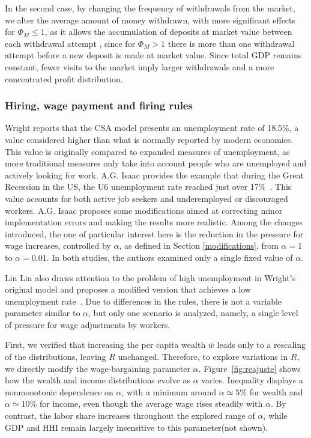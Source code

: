 In the second case, by changing the frequency of withdrawals from the market, we alter the average amount of money withdrawn, with more significant effects for $\Phi_{M}\le1$, as it allows the accumulation of deposits at market value between each withdrawal attempt , since for $\Phi_{M}>1$ there is more than one withdrawal attempt before a new deposit is made at market value. Since total GDP remains constant, fewer visits to the market imply larger withdrawals and a more concentrated profit distribution.

\subsubsection{Hiring, wage payment and firing rules}

\label{sec:hiring}

Wright reports that the CSA model presents an unemployment rate of 18.5\%, a value considered higher than what is normally reported by modern economies. This value is originally compared to expanded measures of unemployment, as more traditional measures only take into account people who are unemployed and actively looking for work. A.G. Isaac provides the example that during the Great Recession in the US, the U6 unemployment rate reached just over 17\%~\cite{ISAAC2019}. This value accounts for both active job seekers and underemployed or discouraged workers. A.G. Isaac proposes some modifications aimed at correcting minor implementation errors and making the results more realistic. Among the changes introduced, the one of particular interest here is the reduction in the pressure for wage increases, controlled by $\alpha$, as defined in Section \ref{modifications}, from $\alpha=1$ to $\alpha=0.01$. In both studies, the authors examined only a single fixed value of $\alpha$. 

Lin Lin also draws attention to the problem of high unemployment in Wright's original model and proposes a modified version that achieves a low unemployment rate~\cite{diss_mods_00007721}. Due to differences in the rules, there is not a variable parameter similar to $\alpha$, but only one scenario is analyzed, namely, a single level of pressure for wage adjustments by workers.

First, we verified that increasing the per capita wealth $\overline{w}$ leads only to a rescaling of the distributions, leaving $R$ unchanged. Therefore, to explore variations in $R$, we directly modify the wage-bargaining parameter $\alpha$. Figure~\ref{fig:reajuste} shows how the wealth and income distributions evolve as $\alpha$ varies. Inequality displays a nonmonotonic dependence on $\alpha$, with a minimum around $\alpha\simeq5\%$ for wealth and $\alpha\simeq10\%$ for income, even though the average wage rises steadily with $\alpha$. By contrast, the labor share increases throughout the explored range of $\alpha$, while GDP and HHI remain largely insensitive to this parameter(not shown).

